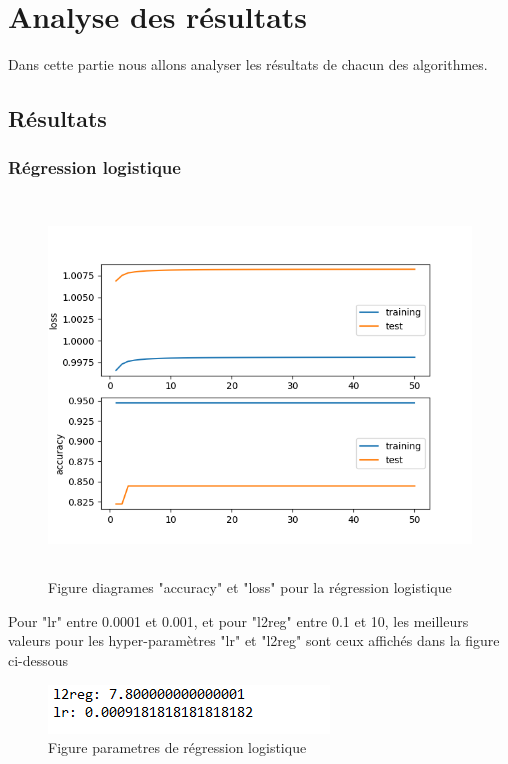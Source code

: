 \chapter{Analyse des résultats}
\par Dans cette partie nous allons analyser les résultats de chacun des algorithmes.
\section{Résultats}
\subsection{Régression logistique}
\begin{figure}[H]
    \centering
    \includegraphics[width=17cm, height=10cm, keepaspectratio]{logistique_plot.png}
    \caption{Figure diagrames "accuracy" et "loss" pour la régression logistique }
    \label{Figure diagrames "accuracy" et "loss" pour la régression logistique  }
\end{figure}
\par Pour "lr" entre 0.0001 et 0.001, et pour "l2reg" entre 0.1 et 10, les meilleurs valeurs pour les hyper-paramètres "lr" et "l2reg" sont ceux affichés dans la figure ci-dessous
\begin{figure}[H]
    \centering
    \includegraphics{logistique_param.PNG}
    \caption{Figure parametres de régression logistique}
    \label{Figure parametres de régression logistique }
\end{figure}
